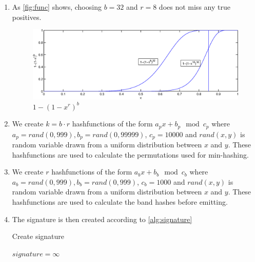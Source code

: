 \documentclass[a4paper, 11pt]{article}
\begin{document}
\begin{enumerate} 

\item As \autoref{fig:func} shows, choosing $b=32$ and $r=8$ does not miss any true positives.

\begin{figure}
\centering
\includegraphics[scale=.5]{project1/func.eps}
\caption{$1-(1-x^r)^b$}\label{fig:func}
\end{figure}

\item We create $k = b \cdot r$ hashfunctions of the form $ a_px + b_p \mod c_p$
where $a_p=rand(0,999), b_p=rand(0,99999)$, $c_p=10000$ and $rand(x,y)$ is
random variable drawn from a uniform distribution between $x$ and $y$. These
hashfunctions are used to calculate the permutations used for min-hashing.

\item We create $r$ hashfunctions of the form $ a_bx + b_b \mod c_b$ where
$a_b=rand(0,999), b_b=rand(0,999)$, $c_b=1000$ and $rand(x,y)$ is random
variable drawn from a uniform distribution between $x$ and $y$. These
hashfunctions are used to calculate the band hashes before emitting.

\item The signature is then created according to \autoref{alg:signature}

\begin{algorithm}

\caption{Create signature}\label{alg:signature}

\begin{algorithmic} 

\STATE $signature = \infty$




\ENDFOR

\ENDFOR


\end{algorithmic}
\end{algorithm}
\end{enumerate}
\end{document}
